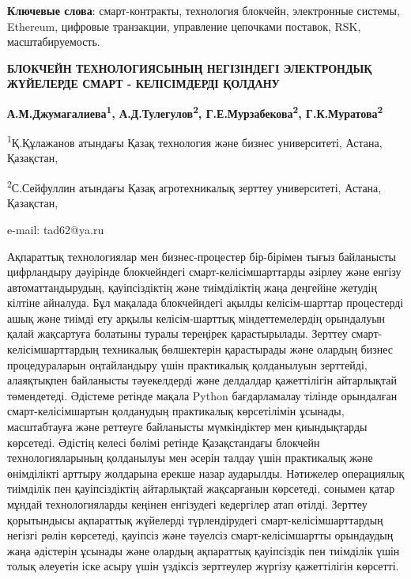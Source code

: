 {\bfseries Ключевые слова}: смарт-контракты, технология блокчейн,
электронные системы, Ethereum, цифровые транзакции, управление цепочками
поставок, RSK, масштабируемость.

\begin{center}
{\large\bfseries БЛОКЧЕЙН ТЕХНОЛОГИЯСЫНЫҢ НЕГІЗІНДЕГІ ЭЛЕКТРОНДЫҚ ЖҮЙЕЛЕРДЕ СМАРТ
- КЕЛІСІМДЕРДІ ҚОЛДАНУ}

{\bfseries А.М.Джумагалиева\textsuperscript{1},
А.Д.Тулегулов\textsuperscript{2}\envelope, Г.Е.Мурзабекова\textsuperscript{2},
Г.К.Муратова\textsuperscript{2}}

\textsuperscript{1}Қ.Құлажанов атындағы Қазақ технология және бизнес
университеті, Астана, Қазақстан,

\textsuperscript{2}С.Сейфуллин атындағы Қазақ агротехникалық зерттеу
университеті, Астана, Қазақстан,

e-mail: tad62@ya.ru
\end{center}

Ақпараттық технологиялар мен бизнес-процестер бір-бірімен тығыз
байланысты цифрландыру дәуірінде блокчейндегі смарт-келісімшарттарды
әзірлеу және енгізу автоматтандырудың, қауіпсіздіктің және тиімділіктің
жаңа деңгейіне жетудің кілтіне айналуда. Бұл мақалада блокчейндегі
ақылды келісім-шарттар процестерді ашық және тиімді ету арқылы
келісім-шарттық міндеттемелердің орындалуын қалай жақсартуға болатыны
туралы тереңірек қарастырылады. Зерттеу смарт-келісімшарттардың
техникалық бөлшектерін қарастырады және олардың бизнес процедураларын
оңтайландыру үшін практикалық қолданылуын зерттейді, алаяқтықпен
байланысты тәуекелдерді және делдалдар қажеттілігін айтарлықтай
төмендетеді. Әдістеме ретінде мақала Python бағдарламалау тілінде
орындалған смарт-келісімшартын қолданудың практикалық көрсетілімін
ұсынады, масштабтауға және реттеуге байланысты мүмкіндіктер мен
қиындықтарды көрсетеді. Әдістің келесі бөлімі ретінде Қазақстандағы
блокчейн технологияларының қолданылуы мен әсерін талдау үшін практикалық
және өнімділікті арттыру жолдарына ерекше назар аударылды. Нәтижелер
операциялық тиімділік пен қауіпсіздіктің айтарлықтай жақсарғанын
көрсетеді, сонымен қатар мұндай технологияларды кеңінен енгізудегі
кедергілер атап өтілді. Зерттеу қорытындысы ақпараттық жүйелерді
түрлендірудегі смарт-келісімшарттардың негізгі рөлін көрсетеді, қауіпсіз
және тәуелсіз смарт-келісімшартты орындаудың жаңа әдістерін ұсынады және
олардың ақпараттық қауіпсіздік пен тиімділік үшін толық әлеуетін іске
асыру үшін үздіксіз зерттеулер жүргізу қажеттілігін көрсетті.

